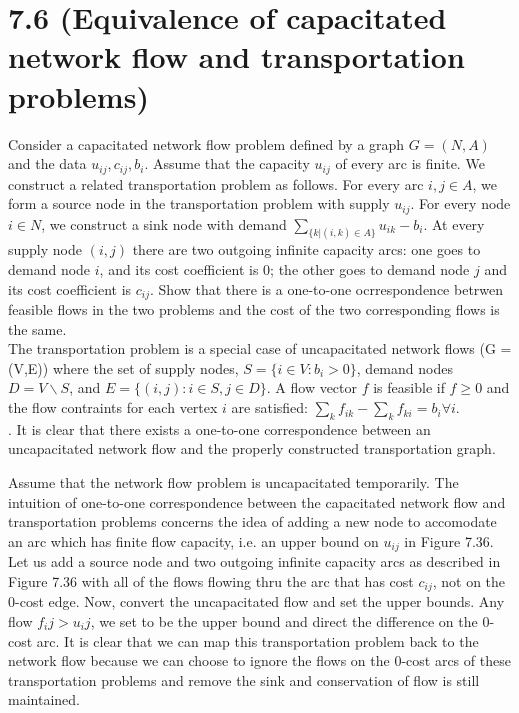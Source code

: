 \documentclass{article}
\begin{document}
\section*{7.6 (Equivalence of capacitated network flow and transportation problems)}
Consider a capacitated network flow problem defined by a graph $G = (N,A)$ and the data $u_{ij}, c_{ij}, b_i$.  Assume that the capacity $u_{ij}$ of every arc is finite.  We construct a related transportation problem as follows.  For every arc $i,j \in A$, we form a source node in the transportation problem with supply $u_{ij}$.  For every node $i \in N$, we construct a sink node with demand $\sum_{\{k | (i,k) \in A \}} u_{ik} - b_i$.  At every supply node $(i,j)$ there are two outgoing infinite capacity arcs:  one goes to demand node $i$, and its cost coefficient is 0; the other goes to demand node $j$ and its cost coefficient is $c_{ij}$.  Show that there is a one-to-one ocrrespondence betrwen feasible flows in the two problems and the cost of the two corresponding flows is the same. \\

\noindent
The transportation problem is a special case of uncapacitated network flows (G = (V,E)) where the set of supply nodes, $S = \{i \in V: b_i > 0\}$, demand nodes $D = V \backslash S$, and $E = \{(i,j): i \in S, j \in D\}$.  A flow vector $f$ is feasible if $f \geq 0$ and the flow contraints for each vertex $i$ are satisfied:  $\sum_k f_{ik} - \sum_k f_{ki} = b_i \forall i$.  \\.  It is clear that there exists a one-to-one correspondence between an uncapacitated network flow and the properly constructed transportation graph.

\noindent
Assume that the network flow problem is uncapacitated temporarily.  The intuition of one-to-one correspondence between the capacitated network flow and transportation problems concerns the idea of adding a new node to accomodate an arc which has finite flow capacity, i.e. an upper bound on $u_{ij}$ in Figure 7.36.  Let us add a source node and two outgoing infinite capacity arcs as described in Figure 7.36 with all of the flows flowing thru the arc that has cost $c_{ij}$, not on the 0-cost edge.  Now, convert the uncapacitated flow and set the upper bounds.  Any flow $f_ij > u_ij$, we set to be the upper bound and direct the difference on the 0-cost arc.  It is clear that we can map this transportation problem back to the network flow because we can choose to ignore the flows on the 0-cost arcs of these transportation problems and remove the sink and conservation of flow is still maintained.  
\end{document}
